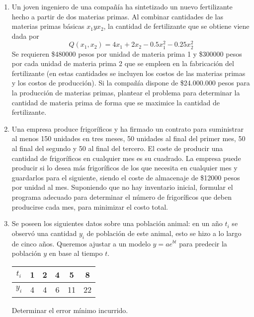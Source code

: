 \documentclass[12pt]{article}
\begin{document}
\begin{center}
\begin{enumerate}
            \item Un joven ingeniero de una compañía ha sintetizado un nuevo fertilizante hecho a partir de dos materias primas. 
            Al combinar cantidades de las materias primas básicas $x_{1} y x_{2}$,
            la cantidad de fertilizante que se obtiene viene dada por
            \[
                Q(x_{1},x_{2}) = 4x_{1} + 2x_{2} - 0.5x_{1}^{2}- 0.25x_{2}^{2}
            \]  
            Se requieren \$480000 pesos por unidad de materia prima 1 y \$300000 pesos por cada unidad de materia prima 2 que se empleen en la fabricación del fertilizante (en estas cantidades se incluyen los costos de las materias primas y los costos de producción). 
            Si la compañía dispone de \$24.000.000 pesos para la producción de materias primas, plantear el problema para determinar la cantidad de materia prima de forma que se maximice la cantidad de fertilizante.

            \item Una empresa produce frigoríficos y ha firmado un contrato para suministrar al menos 150 unidades en tres meses, 50 unidades al final del primer mes, 50 al final del segundo y 50 al final del tercero. 
            El coste de producir una cantidad de frigoríficos en cualquier mes es su
            cuadrado. 
            La empresa puede producir si lo desea más frigoríficos de los que necesita en
            cualquier mes y guardarlos para el siguiente, siendo el coste de almacenaje de \$12000 pesos por unidad al mes. 
            Suponiendo que no hay inventario inicial, formular el programa adecuado para determinar el número de frigoríficos que deben producirse cada mes, para
            minimizar el costo total.

            \item Se poseen los siguientes datos sobre una población animal:  
            en un año $t_{i}$ se observó una cantidad $y_{i}$ de población de este animal, esto se hizo a lo largo de cinco años. 
            Queremos ajustar a un modelo $y = ae^{bt}$ para predecir la población $y$ en base al tiempo $t$.
            \begin{center}
                \begin{adjustbox}{width = 0.30 \textwidth}
                  \begin{tabular}{|c |c | c | c|c|c|}
                    \hline
                     $t_{i}$ & 1 & 2 & 4 & 5 & 8 \\
                     \hline
                     $y_{i}$ & 4 & 4 & 6 & 11 & 22 \\
                    \hline 
                  \end{tabular}
                \end{adjustbox}
             \end{center}
            Determinar el error mínimo incurrido.


\end{enumerate}
\end{center}
\end{document}
